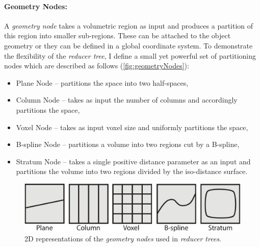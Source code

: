 \paragraph{Geometry Nodes:}A \emph{geometry node} takes a volumetric region as input and produces a partition of this region into smaller sub-regions. 
These can be attached to the object geometry or they can be defined in a global coordinate system.
To demonstrate the flexibility of the \emph{reducer tree}, I define a small yet powerful set of partitioning nodes which are described as follows 
 (\autoref{fig:geometryNodes}):\vspace{-0.25\baselineskip}
\begin{itemize}
\item Plane Node --  partitions the space into two half-spaces, \vspace{-0.25\baselineskip}
\item Column Node -- takes as input the number of columns and accordingly partitions the space,\vspace{-0.25\baselineskip}
\item Voxel Node -- takes as input voxel size and uniformly partitions the space,\vspace{-0.25\baselineskip}
\item B-spline Node -- partitions a volume into two regions cut by a B-spline,\vspace{-0.25\baselineskip}
\item Stratum Node -- takes a single positive distance parameter as an input and partitions the volume into two regions divided by the iso-distance surface.\vspace{-0.25\baselineskip}
\end{itemize} 

\begin{figure}[h]
\centering
\includegraphics[width=0.7\linewidth]{figure/geometryNodes}
\caption{2D representations  of the \emph{geometry nodes} used in \emph{reducer trees}.}
\label{fig:geometryNodes}
\end{figure}

